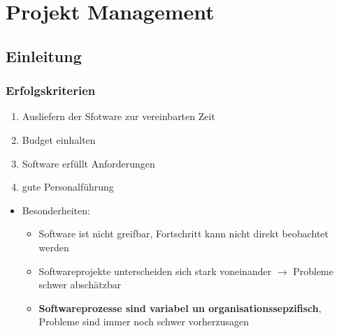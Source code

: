 \chapter{Projekt Management}
\section{Einleitung}
\subsection{Erfolgskriterien}
\begin{enumerate}
    \item Ausliefern der Sfotware zur vereinbarten Zeit
    \item Budget einhalten
    \item Software erfüllt Anforderungen 
    \item gute Personalführung
\end{enumerate}
\begin{itemize}
    \item Besonderheiten:
    \begin{itemize}
        \item Software ist nicht greifbar, Fortschritt kann nicht direkt beobachtet werden
        \item Softwareprojekte unterscheiden sich stark voneinander $\rightarrow$ Probleme schwer abschätzbar
        \item \textbf{Softwareprozesse sind variabel un organisationssepzifisch}, Probleme sind immer noch schwer vorherzusagen
    \end{itemize}
\end{itemize}

